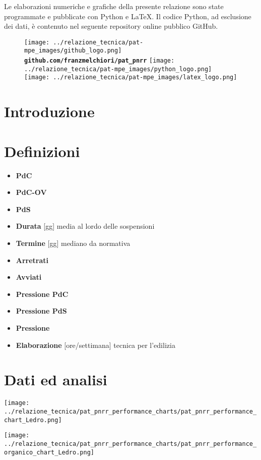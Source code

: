 \documentclass[a4paper]{article}
\begin{document}
	\tableofcontents
	\clearpage
	
	Le elaborazioni numeriche e grafiche della presente relazione sono state programmate e pubblicate con Python e LaTeX. Il codice Python, ad esclusione dei dati, è contenuto nel seguente repository online pubblico GitHub.\\
	\begin{figure}[!htbp]
		\begin{center}
			\texttt{[image: ../relazione\_tecnica/pat-mpe\_images/github\_logo.png]} \textbf{\texttt{github.com/franzmelchiori/pat\_pnrr}} \hspace{0.3cm}
			\texttt{[image: ../relazione\_tecnica/pat-mpe\_images/python\_logo.png]} \hspace{0.3cm}
			\texttt{[image: ../relazione\_tecnica/pat-mpe\_images/latex\_logo.png]}\\
		\end{center}
	\end{figure}
	\clearpage

	\section{Introduzione}

	\section{Definizioni}
	\begin{itemize}
		\item \textbf{PdC}
		\item \textbf{PdC-OV}
		\item \textbf{PdS}
		\item \textbf{Durata} [gg]  media al lordo delle sospensioni
		\item \textbf{Termine} [gg] mediano da normativa
		\item \textbf{Arretrati}
		\item \textbf{Avviati}
		\item \textbf{Pressione PdC}
		\item \textbf{Pressione PdS}
		\item \textbf{Pressione}
		\item \textbf{Elaborazione} [ore/settimana] tecnica per l'edilizia
	\end{itemize}

	\section{Dati ed analisi}
	
	\begin{center}
		\texttt{[image: ../relazione\_tecnica/pat\_pnrr\_performance\_charts/pat\_pnrr\_performance\_chart\_Ledro.png]}
	\end{center}
	\begin{center}
		\texttt{[image: ../relazione\_tecnica/pat\_pnrr\_performance\_charts/pat\_pnrr\_performance\_organico\_chart\_Ledro.png]}
	\end{center}
\end{document}
